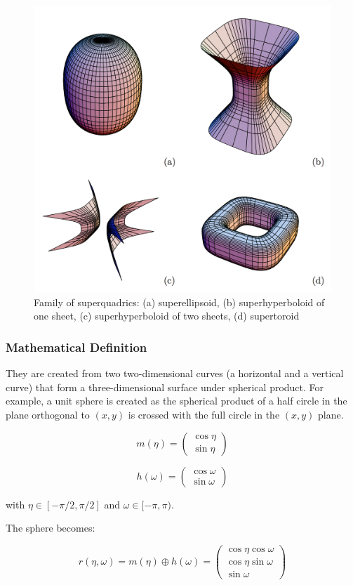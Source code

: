 \documentclass{article}
\begin{document}
\begin{figure}
\centering
\includegraphics[width=0.5\columnwidth]{figures/superquadric_family}
\caption{Family of superquadrics: (a) superellipsoid, (b) superhyperboloid of one sheet, (c) superhyperboloid of two sheets, (d) supertoroid}
\label{fig:superquadric_family}
\end{figure}

\subsubsection*{Mathematical Definition}
They are created from two two-dimensional curves (a horizontal and a vertical curve) that form a three-dimensional surface under spherical product. For example, a unit sphere is created as the spherical product of a half circle in the plane orthogonal to $(x, y)$ is crossed with the full circle in the $(x, y)$ plane.

\begin{equation}
m (\eta) = \begin{pmatrix} \cos {\eta} \\ \sin{\eta} \end{pmatrix}
\end{equation}

\begin{equation}
h(\omega) = \begin{pmatrix} \cos {\omega} \\ \sin {\omega} \end{pmatrix}
\end{equation}

with $\eta \in [-\pi/2, \pi/2]$ and $\omega \in [-\pi, \pi)$.

The sphere becomes:

\begin{equation}
r (\eta, \omega) = m (\eta) \oplus h (\omega) = \begin{pmatrix} \cos{\eta} \cos{\omega} \\ \cos{\eta} \sin{\omega} \\ \sin{\omega} \end{pmatrix}
\end{equation}
\end{document}

